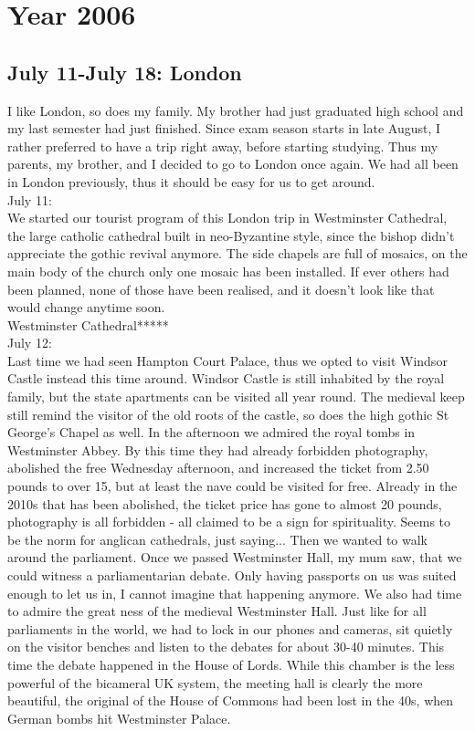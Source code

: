 \chapter{Year 2006}
\label{2006}


\section{July 11-July 18: London}
\label{2006:London}

I like London, so does my family. My brother had just graduated high school and my last semester had just finished. Since exam season starts in late August, I rather preferred to have a trip right away, before starting studying. Thus my parents, my brother, and I decided to go to London once again. We had all been in London previously, thus it should be easy for us to get around.\\

July 11:\\
We started our tourist program of this London trip in Westminster Cathedral, the large catholic cathedral built in neo-Byzantine style, since the bishop didn't appreciate the gothic revival anymore. The side chapels are full of mosaics, on the main body of the church only one mosaic has been installed. If ever others had been planned, none of those have been realised, and it doesn't look like that would change anytime soon.\\

Westminster Cathedral*****\\

July 12:\\
Last time we had seen Hampton Court Palace, thus we opted to visit Windsor Castle instead this time around. Windsor Castle is still inhabited by the royal family, but the state apartments can be visited all year round. The medieval keep still remind the visitor of the old roots of the castle, so does the high gothic St George's Chapel as well. In the afternoon we admired the royal tombs in Westminster Abbey. By this time they had already forbidden photography, abolished the free Wednesday afternoon, and increased the ticket from 2.50 pounds to over 15, but at least the nave could be visited for free. Already in the 2010s that has been abolished, the ticket price has gone to almost 20 pounds, photography is all forbidden - all claimed to be a sign for spirituality. Seems to be the norm for anglican cathedrals, just saying... Then we wanted to walk around the parliament. Once we passed Westminster Hall, my mum saw, that we could witness a parliamentarian debate. Only having passports on us was suited enough to let us in, I cannot imagine that happening anymore. We also had time to admire the great ness of the medieval Westminster Hall. Just like for all parliaments in the world, we had to lock in our phones and cameras, sit quietly on the visitor benches and listen to the debates for about 30-40 minutes. This time the debate happened in the House of Lords. While this chamber is the less powerful of the bicameral UK system, the meeting hall is clearly the more beautiful, the original of the House of Commons had been lost in the 40s, when German bombs hit Westminster Palace.\\

